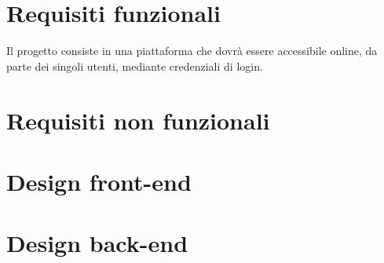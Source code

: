 \documentclass[11pt, a4paper]{article}
\begin{document}
\section{Requisiti funzionali}
Il progetto consiste in una piattaforma che dovrà essere accessibile online, da parte dei singoli utenti, mediante credenziali di login.

\section{Requisiti non funzionali}



\section{Design front-end}
\section{Design back-end}
\end{document}
